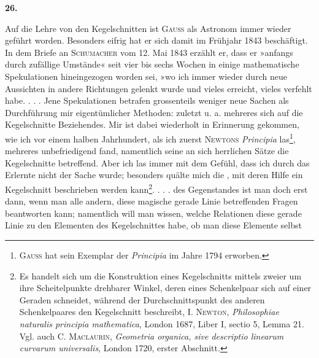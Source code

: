 \clearpage\begingroup{}
\renewcommand{\thefootnote}{\arabic{footnote})}\setcounter{footnote}{1}
\begin{center}
\textbf{26.}\par\smallskip
{}
\end{center}
\noindent\hspace*{\parindent}Auf die Lehre von den Kegelschnitten ist \textsc{Gauss} als Astronom immer
wieder geführt worden. Besonders eifrig hat er sich damit im Frühjahr 1843
beschäftigt. In dem Briefe an \textsc{Schumacher} vom 12. Mai 1843 erzählt er, dass
er »anfangs durch zufällige Umstände« seit vier bis sechs Wochen in einige
mathematische Spekulationen hineingezogen worden sei, »wo ich immer wieder
durch neue Aussichten in andere Richtungen gelenkt wurde und vieles erreicht,
vieles verfehlt habe. . . . Jene Spekulationen betrafen grossenteils weniger
neue Sachen als Durchführung mir eigentümlicher Methoden: zuletzt u. a.
mehreres sich auf die Kegelschnitte Beziehendes. Mir ist dabei wiederholt
in Erinnerung gekommen, wie ich vor einem halben Jahrhundert, als ich
zuerst \textsc{Newtons} \textit{Principia} las\footnote{\textsc{Gauss} hat sein Exemplar der \textit{Principia} im Jahre 1794 erworben.}, mehreres unbefriedigend fand, namentlich seine
an sich herrlichen Sätze die Kegelschnitte betreffend. Aber ich las immer
mit dem Gefühl, dass ich durch das Erlernte nicht  der Sache wurde;
besonders quälte mich die , mit deren Hilfe ein Kegelschnitt
beschrieben werden kann\footnote{Es handelt sich um die Konstruktion eines Kegelschnitts mittels zweier um ihre Scheitelpunkte drehbarer Winkel, deren eines Schenkelpaar sich auf einer Geraden schneidet, während der Durchschnittspunkt des anderen Schenkelpaares den Kegelschnitt beschreibt, I. \textsc{Newton}, \textit{Philosophiae naturalis principia mathematica}, London 1687, Liber I, sectio 5, Lemma 21. Vgl. auch C. \textsc{Maclaurin}, \textit{Geometria organica, sive descriptio linearum curvarum universalis}, London 1720, erster Abschnitt.}. . . .  des Gegenstandes ist man doch erst
dann, wenn man alle andern, diese magische gerade Linie betreffenden Fragen
beantworten kann; namentlich will man wissen, welche Relationen diese gerade
\clearpage{}\setcounter{footnote}{0}
\noindent Linie zu den Elementen des Kegelschnittes habe, ob man diese Elemente selbst
